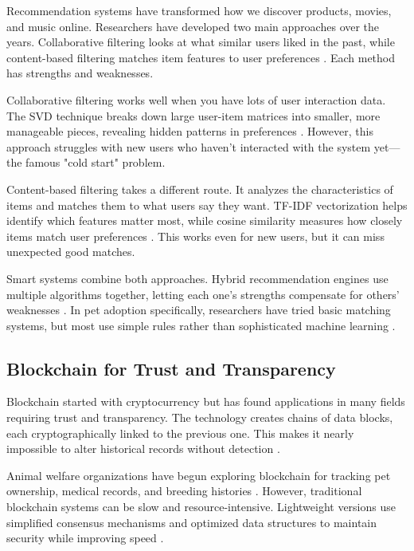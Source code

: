 \documentclass[conference]{IEEEtran}
\begin{document}
Recommendation systems have transformed how we discover products, movies, and music online. Researchers have developed two main approaches over the years. Collaborative filtering looks at what similar users liked in the past, while content-based filtering matches item features to user preferences \cite{recommender2023}. Each method has strengths and weaknesses.

Collaborative filtering works well when you have lots of user interaction data. The SVD technique breaks down large user-item matrices into smaller, more manageable pieces, revealing hidden patterns in preferences \cite{matrixfactor2022}. However, this approach struggles with new users who haven't interacted with the system yet—the famous "cold start" problem.

Content-based filtering takes a different route. It analyzes the characteristics of items and matches them to what users say they want. TF-IDF vectorization helps identify which features matter most, while cosine similarity measures how closely items match user preferences \cite{contentbased2023}. This works even for new users, but it can miss unexpected good matches.

Smart systems combine both approaches. Hybrid recommendation engines use multiple algorithms together, letting each one's strengths compensate for others' weaknesses \cite{hybrid2024}. In pet adoption specifically, researchers have tried basic matching systems, but most use simple rules rather than sophisticated machine learning \cite{petmatching2022}.

\subsection{Blockchain for Trust and Transparency}

Blockchain started with cryptocurrency but has found applications in many fields requiring trust and transparency. The technology creates chains of data blocks, each cryptographically linked to the previous one. This makes it nearly impossible to alter historical records without detection \cite{blockchain2023}.

Animal welfare organizations have begun exploring blockchain for tracking pet ownership, medical records, and breeding histories \cite{animalblock2024}. However, traditional blockchain systems can be slow and resource-intensive. Lightweight versions use simplified consensus mechanisms and optimized data structures to maintain security while improving speed \cite{lightweight2023}.
\end{document}
